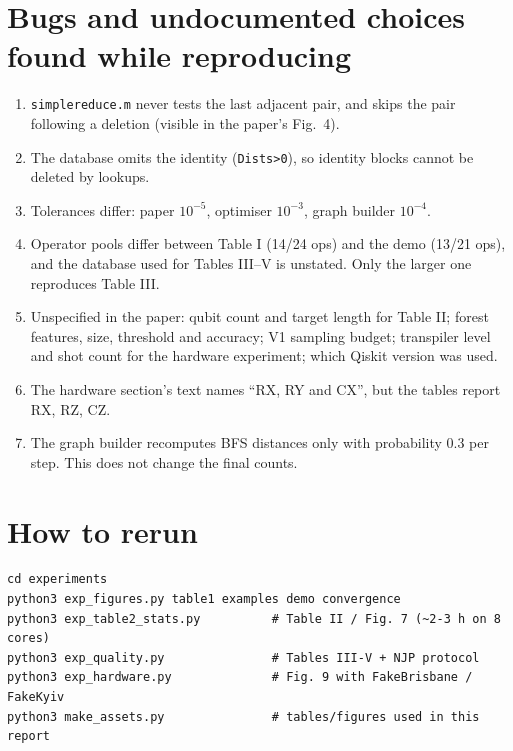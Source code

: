 \documentclass[11pt,a4paper]{article}
\begin{document}
\section{Bugs and undocumented choices found while reproducing}
\begin{enumerate}[nosep]
\item \texttt{simplereduce.m} never tests the last adjacent pair, and skips the pair following a deletion (visible in the paper's Fig.~4).
\item The database omits the identity (\texttt{Dists>0}), so identity blocks cannot be deleted by lookups.
\item Tolerances differ: paper $10^{-5}$, optimiser $10^{-3}$, graph builder $10^{-4}$.
\item Operator pools differ between Table I (14/24 ops) and the demo (13/21 ops), and the database used for Tables III--V is unstated.
  Only the larger one reproduces Table III.
\item Unspecified in the paper: qubit count and target length for Table II; forest features, size, threshold and accuracy;
  V1 sampling budget; transpiler level and shot count for the hardware experiment; which Qiskit version was used.
\item The hardware section's text names ``RX, RY and CX'', but the tables report RX, RZ, CZ.
\item The graph builder recomputes BFS distances only with probability 0.3 per step. This does not change the final counts.
\end{enumerate}

\section{How to rerun}
\begin{verbatim}
cd experiments
python3 exp_figures.py table1 examples demo convergence
python3 exp_table2_stats.py          # Table II / Fig. 7 (~2-3 h on 8 cores)
python3 exp_quality.py               # Tables III-V + NJP protocol
python3 exp_hardware.py              # Fig. 9 with FakeBrisbane / FakeKyiv
python3 make_assets.py               # tables/figures used in this report
\end{verbatim}
\end{document}

